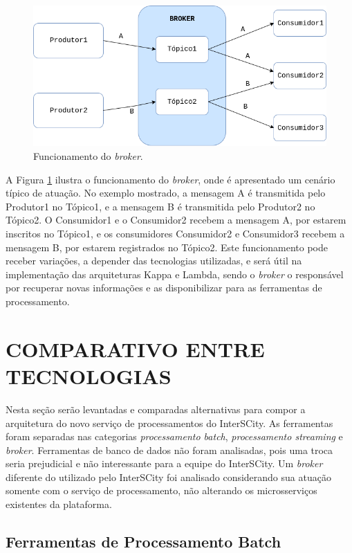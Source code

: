 \begin{figure}
  \centering
    \includegraphics[scale=0.5]{figuras/broker.png}
    \caption{Funcionamento do \textit{broker}.}
  \label{fig:broker}
\end{figure}

A Figura \ref{fig:broker} ilustra o funcionamento do \textit{broker}, onde é
apresentado um cenário típico de atuação. No exemplo mostrado, a mensagem A
é transmitida pelo Produtor1 no Tópico1, e a mensagem B é transmitida pelo
Produtor2 no Tópico2. O Consumidor1 e o Consumidor2 recebem a mensagem A, por
estarem inscritos no Tópico1, e os consumidores Consumidor2 e Consumidor3
recebem a mensagem B, por estarem registrados no Tópico2. Este funcionamento
pode receber variações, a depender das tecnologias utilizadas, e será útil
na implementação das arquiteturas Kappa e Lambda, sendo o
\textit{broker} o responsável por recuperar novas informações e as
disponibilizar para as ferramentas de processamento.

\section{COMPARATIVO ENTRE TECNOLOGIAS}

Nesta seção serão levantadas e comparadas alternativas para compor a
arquitetura do novo serviço de processamentos do InterSCity. As ferramentas
foram separadas nas categorias \textit{processamento batch},
\textit{processamento streaming} e \textit{broker}. Ferramentas de banco de
dados não foram analisadas, pois uma troca seria prejudicial e não interessante
para a equipe do InterSCity. Um \textit{broker} diferente do utilizado pelo
InterSCity foi analisado considerando sua atuação somente com o serviço de
processamento, não alterando os microsserviços existentes da plataforma.

\subsection{Ferramentas de Processamento Batch}

